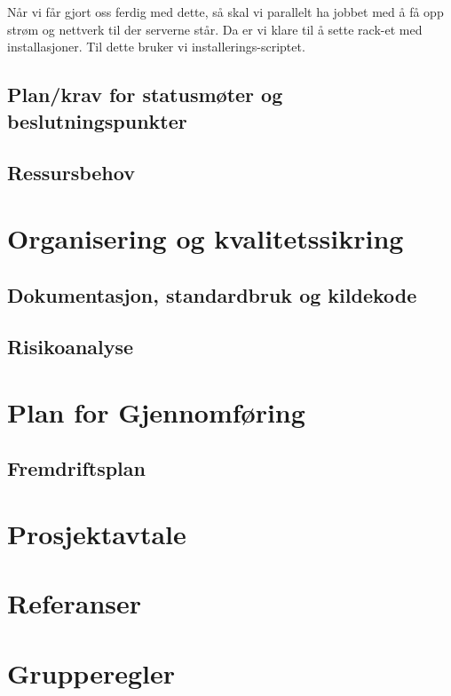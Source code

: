 \documentclass[12pt,a4paper]{article}
\begin{document}
Når vi får gjort oss ferdig med dette, så skal vi parallelt ha jobbet med å få opp strøm og nettverk til der serverne står. Da er vi klare
til å sette rack-et med installasjoner. Til dette bruker vi installerings-scriptet. 

\subsection{Plan/krav for statusmøter og beslutningspunkter}
\subsection{Ressursbehov}

\section{Organisering og kvalitetssikring}
\subsection{Dokumentasjon, standardbruk og kildekode}
\subsection{Risikoanalyse}

\section{Plan for Gjennomføring}
\subsection{Fremdriftsplan}

\section{Prosjektavtale}

\section{Referanser}

\section{Grupperegler}
\end{document}
